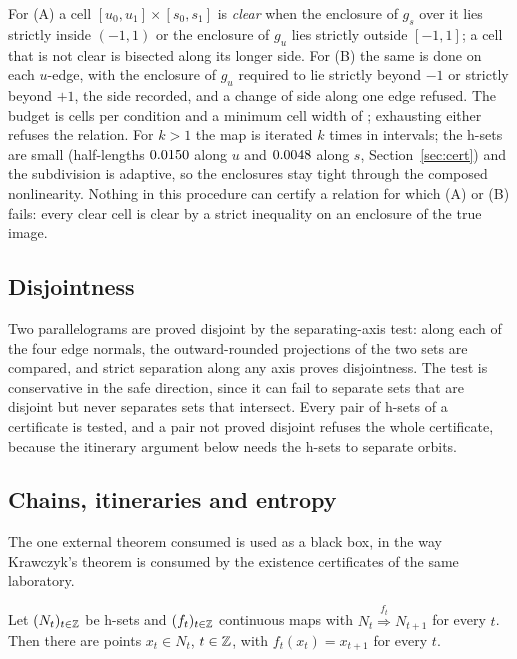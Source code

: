\documentclass[11pt]{article}
\newcommand{\cover}[1]{\stackrel{#1}{\Longrightarrow}}
\begin{document}
For (A) a cell $[u_0,u_1]\times[s_0,s_1]$ is \emph{clear} when the enclosure of $g_s$ over it lies strictly inside
$(-1,1)$ or the enclosure of $g_u$ lies strictly outside $[-1,1]$; a cell that is not clear is bisected along its
longer side. For (B) the same is done on each $u$-edge, with the enclosure of $g_u$ required to lie strictly beyond
$-1$ or strictly beyond $+1$, the side recorded, and a change of side along one edge refused. The budget is
\CellBudget{} cells per condition and a minimum cell width of \MinWidth; exhausting either refuses the relation. For
$k>1$ the map is iterated $k$ times in intervals; the h-sets are small (half-lengths $0.0150$ along $u$ and
$0.0048$ along $s$, Section~\ref{sec:cert}) and the subdivision is adaptive, so the enclosures stay tight through
the composed nonlinearity. Nothing in this procedure can certify a relation for which (A) or (B) fails: every clear
cell is clear by a strict inequality on an enclosure of the true image.

\subsection{Disjointness}

Two parallelograms are proved disjoint by the separating-axis test: along each of the four edge normals, the
outward-rounded projections of the two sets are compared, and strict separation along any axis proves
disjointness. The test is conservative in the safe direction, since it can fail to separate sets that are disjoint
but never separates sets that intersect. Every pair of h-sets of a certificate is tested, and a pair not proved
disjoint refuses the whole certificate, because the itinerary argument below needs the h-sets to separate orbits.

\subsection{Chains, itineraries and entropy}

The one external theorem consumed is used as a black box, in the way Krawczyk's theorem \cite{Kra69} is consumed by
the existence certificates of the same laboratory.

\begin{theorem}\label{thm:zg}
Let $(N_t)_{t\in\mathbb{Z}}$ be h-sets and $(f_t)_{t\in\mathbb{Z}}$ continuous maps with $N_t\cover{f_t}N_{t+1}$ for every $t$. Then
there are points $x_t\in N_t$, $t\in\mathbb{Z}$, with $f_t(x_t)=x_{t+1}$ for every $t$.
\end{theorem}
\end{document}
